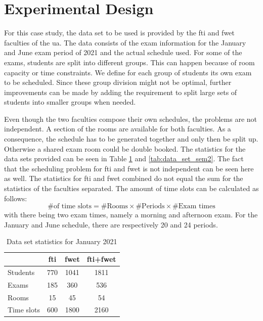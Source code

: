 \section{Experimental Design}\label{sec:experiment}

For this case study, the data set to be used is provided by the \acrshort{fti} and \acrshort{fwet} faculties of the \acrfull{ua}. The data consists of the exam information for the January and June exam period of 2021 and the actual schedule used. For some of the exams, students are split into different groups. This can happen because of room capacity or time constraints. We define for each group of students its own exam to be scheduled. Since these group division might not be optimal, further improvements can be made by adding the requirement to split large sets of students into smaller groups when needed.

Even though the two faculties compose their own schedules, the problems are not independent. A section of the rooms are available for both faculties. As a consequence, the schedule has to be generated together and only then be split up. Otherwise a shared exam room could be double booked. The statistics for the data sets provided can be seen in Table \ref{tab:data_set_sem1} and \ref{tab:data_set_sem2}. The fact that the scheduling problem for \acrshort{fti} and \acrshort{fwet} is not independent can be seen here as well. The statistics for \acrshort{fti} and \acrshort{fwet} combined do not equal the sum for the statistics of the faculties separated. The amount of time slots can be calculated as follows:
\begin{equation}
    \text{\# of time slots} = \text{\# Rooms} \times \text{\# Periods} \times \text{\# Exam times}  
\end{equation}
with there being two exam times, namely a morning and afternoon exam. For the January and June schedule, there are respectively 20 and 24 periods.
\begin{table}[h]
	\caption{Data set statistics for January 2021}
	\label{tab:data_set_sem1}
	\centering
	\begin{tabular}{l c c c }
		\hline
		& \textbf{\acrshort{fti}} & \textbf{\acrshort{fwet}} & \textbf{\acrshort{fti}+\acrshort{fwet}} \\ \hline
		Students & 770 & 1041 & 1811 \\
		Exams & 185 & 360 & 536 \\
	    Rooms & 15 & 45 & 54 \\
        Time slots & 600 & 1800 & 2160 \\ \hline
	\end{tabular}
\end{table}

